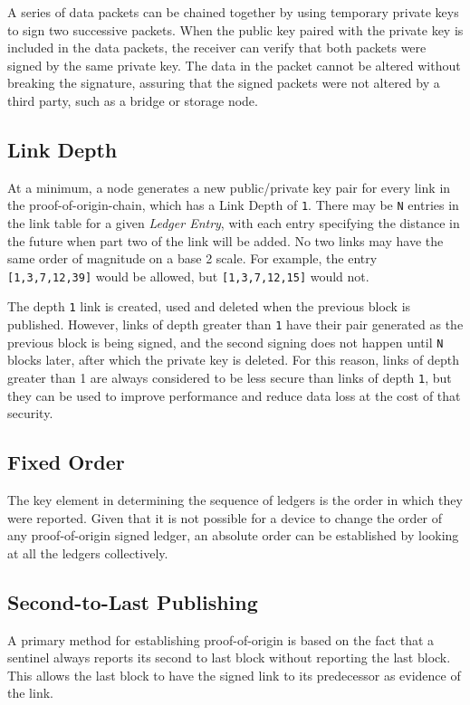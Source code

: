 \documentclass{article}
\begin{document}
A series of data packets can be chained together by using temporary private keys to sign two successive packets. When the public key paired with the private key is included in the data packets, the receiver can verify that both packets were signed by the same private key. The data in the packet cannot be altered without breaking the signature, assuring that the signed packets were not altered by a third party, such as a \Gls{bridge} or storage node.

\subsection {Link Depth}
At a minimum, a node generates a new public/private key pair for every link in the \Gls{proof-of-origin-chain}, which has a Link Depth of \texttt{1}. There may be \texttt{N} entries in the link table for a given \textit{Ledger Entry}, with each entry specifying the distance in the future when part two of the link will be added. No two links may have the same order of magnitude on a base 2 scale. For example, the entry \texttt{[1,3,7,12,39]} would be allowed, but \texttt{[1,3,7,12,15]} would not.

The depth \texttt{1} link is created, used and deleted when the previous block is published. However, links of depth greater than \texttt{1} have their pair generated as the previous block is being signed, and the second signing does not happen until \texttt{N} blocks later, after which the private key is deleted. For this reason, links of depth greater than 1 are always considered to be less secure than links of depth \texttt{1}, but they can be used to improve performance and reduce data loss at the cost of that security.

\subsection {Fixed Order}
The key element in determining the sequence of ledgers is the order in which they were reported. Given that it is not possible for a device to change the order of any \Gls{proof-of-origin} signed ledger, an absolute order can be established by looking at all the ledgers collectively.

\subsection {Second-to-Last Publishing}
A primary method for establishing \Gls{proof-of-origin} is based on the fact that a \Gls{sentinel} always reports its second to last block without reporting the last block. This allows the last block to have the signed link to its predecessor as evidence of the link.
\end{document}
